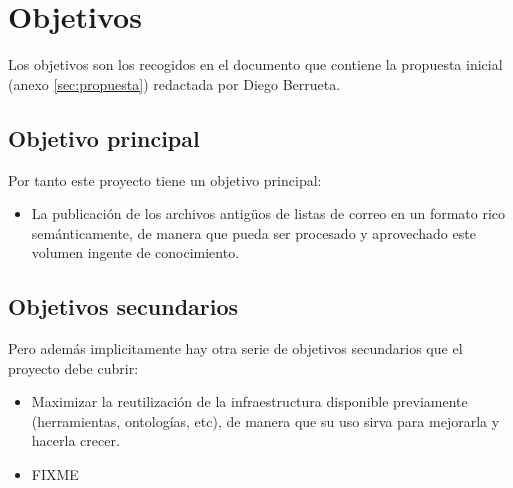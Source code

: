 
\section{Objetivos}

Los objetivos son los recogidos en el documento que contiene la propuesta 
inicial (anexo \ref{sec:propuesta}) redactada por Diego Berrueta.

\subsection{Objetivo principal}

Por tanto este proyecto tiene un objetivo principal:

\begin{itemize}
  \item La publicación de los archivos antigüos de listas de correo en un 
	formato rico semánticamente, de manera que pueda ser procesado y
	aprovechado este volumen ingente de conocimiento.
\end{itemize}

\subsection{Objetivos secundarios}

Pero además implicitamente hay otra serie de objetivos secundarios que el
proyecto debe cubrir:

\begin{itemize}
  \item Maximizar la reutilización de la infraestructura disponible previamente
	(herramientas, ontologías, etc), de manera que su uso sirva para mejorarla
	y hacerla crecer.
  \item FIXME
\end{itemize}


